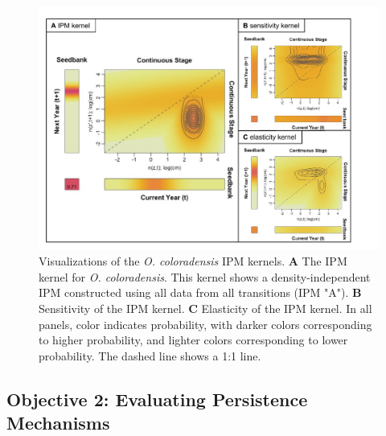 \documentclass[12pt, letterpaper]{article}
\begin{document}
\begin{figure}[h]
  \centering
  \includegraphics[width=\textwidth]{figures/IPM_kernel_figure.pdf}
  \caption{Visualizations of the \textit{O. coloradensis} IPM kernels. \textbf{A} The IPM kernel for \textit{O. coloradensis}. This kernel shows a density-independent IPM constructed using all data from all transitions (IPM "A"). \textbf{B} Sensitivity of the IPM kernel. \textbf{C} Elasticity of the IPM kernel. In all panels, color indicates probability, with darker colors corresponding to higher probability, and lighter colors corresponding to lower probability. The dashed line shows a 1:1 line. }
  \label{fig:IPMKernel}
\end{figure} 

\subsection{Objective 2: Evaluating Persistence Mechanisms}
\end{document}
